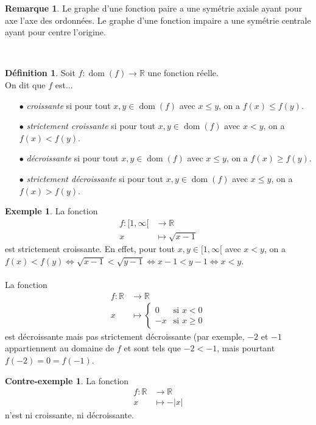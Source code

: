 \documentclass[a4paper,13pt]{scrreprt}
\theoremstyle{plain}
\theoremstyle{definition}
\newtheorem{déf}[subsection]{Définition}
\newtheorem{exe}[subsection]{Exemple}
\newtheorem{con}[subsection]{Contre-exemple}
\newtheorem{rema}[subsection]{Remarque}
\newcommand{\rr}{\mathbb{R}}
\DeclareMathOperator{\dom}{dom}
\begin{document}
\begin{rema}
	Le graphe d'une fonction paire a une symétrie axiale ayant pour axe l'axe des ordonnées. Le graphe d'une fonction impaire a une symétrie centrale ayant pour centre l'origine.
\end{rema}
~~\\
\begin{déf}
	Soit $f : \dom(f) \to \rr$ une fonction réelle. \\
	On dit que $f$ est...
	\begin{itemize}
		\item [$\bullet$] \emph{croissante} si pour tout $x,y \in \dom(f)$ avec $x \le y$, on a $f(x) \le f(y)$.
		\item [$\bullet$] \emph{strictement croissante} si pour tout $x,y \in \dom(f)$ avec $x < y$, on a $f(x) < f(y)$.
		\item [$\bullet$] \emph{décroissante} si pour tout $x,y \in \dom(f)$ avec $x \le y$, on a $f(x) \ge f(y)$.
		\item [$\bullet$] \emph{strictement décroissante} si pour tout $x,y \in \dom(f)$ avec $x \le y$, on a $f(x) > f(y)$.
	\end{itemize}
\end{déf}

\begin{exe}
	La fonction \begin{align*}
	f : [1,\infty[ &\to \rr \\
	x &\mapsto \sqrt{x-1}
	\end{align*}
	est strictement croissante. En effet, pour tout $x,y \in [1,\infty[$ avec $x < y$, on a $f(x) < f(y) \Leftrightarrow \sqrt{x-1} < \sqrt{y-1} \Leftrightarrow x-1 < y-1 \Leftrightarrow x < y$. \\
	~~\\
	La fonction \begin{align*}
	f : \rr &\to \rr \\
	x &\mapsto \begin{cases}
	0&\text{si $x <0$}\\
	-x&\text{si $x \ge 0$}
	\end{cases}
	\end{align*}
	est décroissante mais pas strictement décroissante (par exemple, $-2$ et $-1$ appartiennent au domaine de $f$ et sont tels que $-2 < -1$, mais pourtant $f(-2)=0=f(-1)$.
\end{exe}

\begin{con}
	La fonction \begin{align*}
	f : \rr &\to \rr \\
	x &\mapsto -|x|
	\end{align*}
	n'est ni croissante, ni décroissante.
\end{con}
\end{document}
